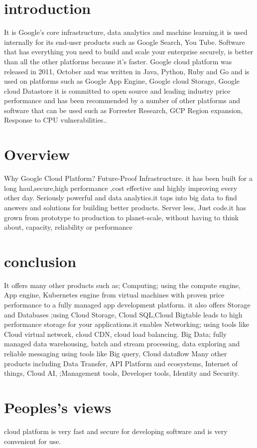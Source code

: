 \documentclass[10pt,]{article}
\begin{document}
\section{introduction}
It is Google’s core infrastructure, data analytics and machine learning.\cite{s1}it is used internally for its end-user products such as Google Search, You Tube\cite{s2}.
Software that has everything you need to build and scale your enterprise securely, is better than all the other platforms because it’s faster. 
Google cloud platform was released in 2011, October and was written in Java, Python, Ruby and Go and is used on platforms such as Google App Engine, Google cloud Storage, Google cloud Datastore
it is committed to open source and leading industry price performance and has been recommended by a number of other platforms and software that can be used such as Forrester Research, GCP Region expansion, Response to CPU vulnerabilities.\cite{s3}.
\section{Overview}
Why Google Cloud Platform?
Future-Proof Infrastructure. it has been built for a long haul,secure,high performance ,cost effective and highly improving every other day.
Seriously powerful and data analytics.it taps into big data to find answers and solutions for building better products.
Server less, Just code.it has grown 
from prototype to production to planet-scale, without having to think about, capacity, reliability or performance
\section{conclusion}
It offers many other products such as;
Computing; using the compute engine, App engine, Kubernetes engine from virtual machines with proven price performance to a fully managed app development platform. it also offers
 Storage and Databases ;using Cloud Storage, Cloud SQL,Cloud Bigtable\cite{s4} leads to high performance storage for your applications.it enables 
Networking; using tools like Cloud virtual network, cloud CDN, cloud load balancing.
 Big Data; fully managed data warehousing, batch and stream processing, data exploring and reliable messaging using tools like Big query, Cloud dataflow
 Many other products including Data Transfer, API Platform and ecosystems, Internet of things, Cloud AI, ;Management tools, Developer tools, Identity and Security\cite{s5}.
\section{Peoples's views}
 cloud platform is very fast and secure for developing software and is very convenient for use.





\end{document}
